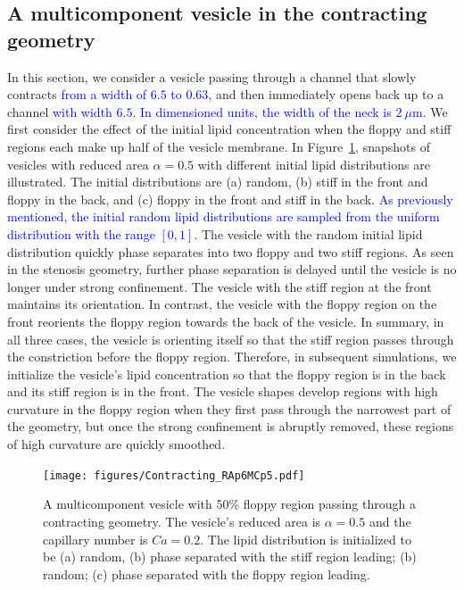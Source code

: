 \documentclass[twoside,twocolumn,9pt]{article}
\begin{document}
\subsection{\label{subsec:Contraction} A multicomponent vesicle in the
contracting geometry}
In this section, we consider a vesicle passing through a channel that
slowly contracts 
\textcolor{blue}{
from a width of $6.5$ to $0.63$,
}
and then immediately opens back up to a channel 
\textcolor{blue}{
with width $6.5$. In dimensioned units, the width of the neck is
$2~\mu$m.
}
We first consider the effect of the initial lipid concentration when the
floppy and stiff regions each make up half of the vesicle membrane. In
Figure~\ref{fig:RA6leftRightRand}, snapshots of vesicles with reduced
area $\alpha = 0.5$ with different initial lipid distributions are
illustrated. The initial distributions are (a) random, (b) stiff in the
front and floppy in the back, and (c) floppy in the front and stiff in
the back. 
\textcolor{blue}{
As previously mentioned, the initial random lipid distributions are
sampled from the uniform distribution with the range $[0,1]$.}
The vesicle with the random initial lipid distribution quickly
phase separates into two floppy and two stiff regions. As seen in the
stenosis geometry, further phase separation is delayed until the vesicle
is no longer under strong confinement. The vesicle with the stiff region
at the front maintains its orientation. In contrast, the vesicle with
the floppy region on the front reorients the floppy region towards the
back of the vesicle. In summary, in all three cases, the vesicle is
orienting itself so that the stiff region passes through the
constriction before the floppy region. Therefore, in subsequent
simulations, we initialize the vesicle's lipid concentration so that the
floppy region is in the back and its stiff region is in the front. The
vesicle shapes develop regions with high curvature in the floppy region
when they first pass through the narrowest part of the geometry, but
once the strong confinement is abruptly removed, these regions of high
curvature are quickly smoothed.

\begin{figure}[h]
  \centering
  \texttt{[image: figures/Contracting\_RAp6MCp5.pdf]}
  \caption{\label{fig:RA6leftRightRand} \small A multicomponent vesicle
  with 50\% floppy region passing through a contracting geometry. The
  vesicle's reduced area is $\alpha = 0.5$ and the capillary number is
  $Ca = 0.2$. The lipid distribution is initialized to be (a) random,
  (b) phase separated with the stiff region leading; (b) random; (c)
  phase separated with the floppy region leading.}
\end{figure}
\end{document}
